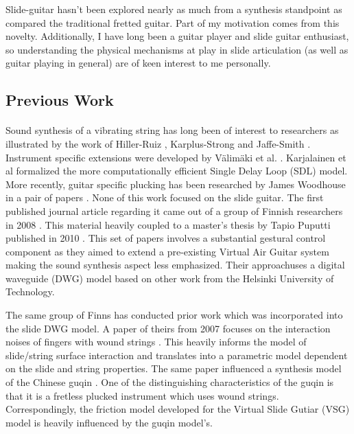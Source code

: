 \documentclass[12pt]{article}
\begin{document}
Slide-guitar hasn’t been explored nearly as much from a synthesis standpoint as compared the traditional fretted guitar. Part of my motivation comes from this novelty. Additionally, I have long been a guitar player and slide guitar enthusiast, so understanding the physical mechanisms at play in slide articulation (as well as guitar playing in general) are of keen interest to me personally.

\subsection*{Previous Work}
\paragraph{}
Sound synthesis of a vibrating string has long been of interest to researchers as illustrated by the work of Hiller-Ruiz \cite{hiller_synthesizing_1971} \cite{hiller_synthesizing_1971-1}, Karplus-Strong \cite{karplus_digital_1983} and Jaffe-Smith \cite{jaffe_extensions_1983}. Instrument specific extensions were developed by Välimäki et al. \cite{vaelimaeki_physical_1996-1}.  Karjalainen et al formalized the more computationally efficient Single Delay Loop (SDL) model\cite{karjalainen_plucked-string_1998}. More recently, guitar specific plucking has been researched by James Woodhouse in a pair of papers \cite{woodhouse_synthesis_2004} \cite{woodhouse_plucked_2004}. None of this work focused on the slide guitar. The first published journal article regarding it came out of a group of Finnish researchers in 2008 \cite{pakarinen_virtual_2008}. This material heavily coupled to a master’s thesis by Tapio Puputti published in 2010 \cite{puputti_real-time_2012}. This set of papers involves a substantial gestural control component as they aimed to extend a pre-existing Virtual Air Guitar system making the sound synthesis aspect less emphasized. Their approachuses a digital waveguide (DWG) model based on other work from the Helsinki University of Technology.

The same group of Finns has conducted prior work which was incorporated into the slide DWG model. A paper of theirs from 2007 focuses on the interaction noises of fingers with wound strings \cite{pakarinen_analysis_2007}. This heavily informs the model of slide/string surface interaction and translates into a parametric model dependent on the slide and string properties. The same paper influenced a synthesis model of the Chinese guqin \cite{penttinen_model-based_2006}. One of the distinguishing characteristics of the guqin is that it is a fretless plucked instrument which uses wound strings. Correspondingly, the friction model developed for the Virtual Slide Gutiar (VSG) model is heavily influenced by the guqin model's.
\end{document}
